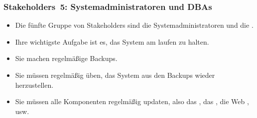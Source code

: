 \documentclass[aspectratio=169,mathserif,notheorems]{beamer}%
\begin{document}
%
\begin{frame}%
\frametitle{Stakeholders~5: Systemadministratoren und DBAs}%
\begin{itemize}%
\item Die fünfte Gruppe von Stakeholders sind die Systemadministratoren und die .%
%
\item<2-> Ihre wichtigste Aufgabe ist es, das System am laufen zu halten.%
%
\item<3-> Sie machen regelmäßige Backups.%
%
\item<4-> Sie müssen regelmäßig üben, das System aus den Backups wieder herzustellen.%
%
\item<5-> Sie müssen alle Komponenten regelmäßig updaten, also das , das , die Web , usw.%
\end{itemize}%
\end{frame}%
%
\end{document}
